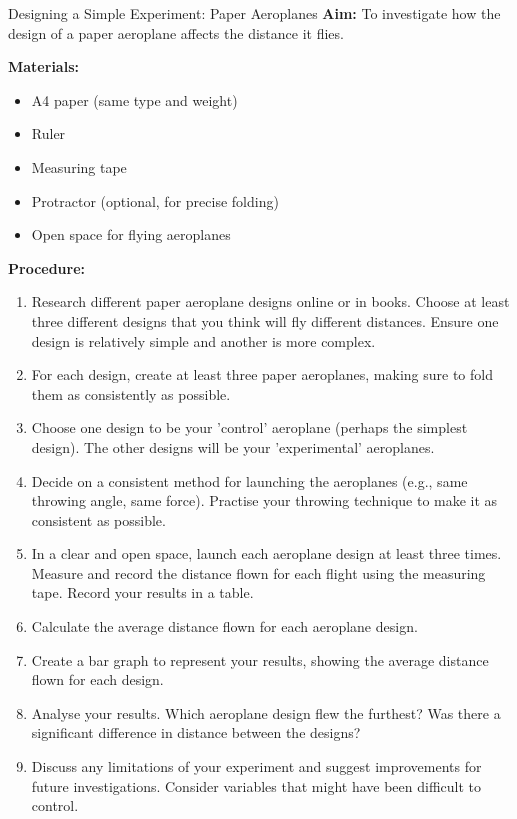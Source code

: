 \begin{investigation}{Designing a Simple Experiment: Paper Aeroplanes}
\textbf{Aim:} To investigate how the design of a paper aeroplane affects the distance it flies.

\textbf{Materials:}
\begin{itemize}
    \item A4 paper (same type and weight)
    \item Ruler
    \item Measuring tape
    \item Protractor (optional, for precise folding)
    \item Open space for flying aeroplanes
\end{itemize}

\textbf{Procedure:}
\begin{enumerate}
    \item Research different paper aeroplane designs online or in books. Choose at least three different designs that you think will fly different distances.  Ensure one design is relatively simple and another is more complex.
    \item For each design, create at least three paper aeroplanes, making sure to fold them as consistently as possible.
    \item Choose one design to be your 'control' aeroplane (perhaps the simplest design). The other designs will be your 'experimental' aeroplanes.
    \item Decide on a consistent method for launching the aeroplanes (e.g., same throwing angle, same force).  Practise your throwing technique to make it as consistent as possible.
    \item In a clear and open space, launch each aeroplane design at least three times. Measure and record the distance flown for each flight using the measuring tape.  Record your results in a table.
    \item Calculate the average distance flown for each aeroplane design.
    \item Create a bar graph to represent your results, showing the average distance flown for each design.
    \item Analyse your results.  Which aeroplane design flew the furthest? Was there a significant difference in distance between the designs?
    \item Discuss any limitations of your experiment and suggest improvements for future investigations.  Consider variables that might have been difficult to control.
\end{enumerate}


\end{investigation}
